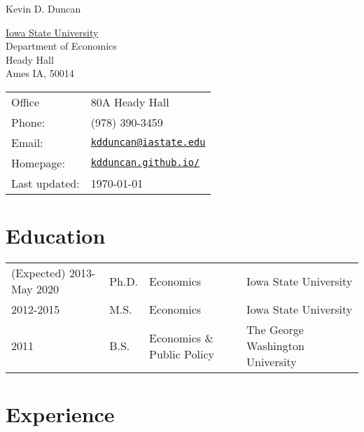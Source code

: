\documentclass[letterpaper]{article}
\def\name{Kevin D. Duncan}
\begin{document}
{\huge \name}



\begin{minipage}{0.45\linewidth}
  \href{http://www.unc.edu/}{Iowa State University} \\
  Department of Economics \\
  Heady Hall \\
  Ames IA, 50014
\end{minipage}
\begin{minipage}{0.45\linewidth}
  \begin{tabular}{ll}
    Office & 80A Heady Hall \\
    Phone: & (978) 390-3459 \\
    Email: & \href{mailto:kdduncan@iastate.edu}{\tt kdduncan@iastate.edu} \\
    Homepage: & \href{kdduncan.github.io/}{\tt kdduncan.github.io/} \\
    Last updated: & \today \\
  \end{tabular}
\end{minipage}


\section*{Education}

\begin{tabular}{@{}llll}
  (Expected) 2013-May 2020  & Ph.D. &Economics &Iowa State University \\
    2012-2015 &M.S. &Economics &Iowa State University \\
  2011 & B.S. &Economics \& Public Policy &The George Washington University
\end{tabular}

\section*{Experience}
\end{document}
